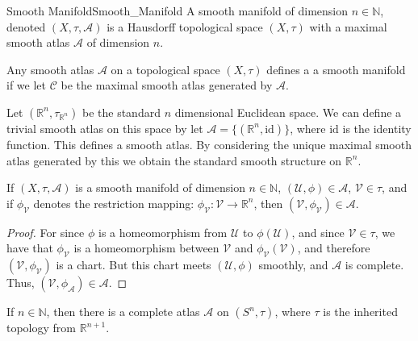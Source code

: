 \documentclass[oneside]{book}                                                  %
\begin{document}
            \begin{fdefinition}{Smooth Manifold}{Smooth_Manifold}
                A smooth manifold of dimension $n\in\mathbb{N}$, denoted
                $(X,\tau,\mathcal{A})$ is a Hausdorff topological space
                $(X,\tau)$ with a maximal smooth atlas $\mathcal{A}$ of
                dimension $n$.
            \end{fdefinition}
            Any smooth atlas $\mathcal{A}$ on a topological space $(X,\tau)$
            defines a a smooth manifold if we let $\mathcal{C}$ be the maximal
            smooth atlas generated by $\mathcal{A}$.
            \begin{example}
                Let $(\mathbb{R}^{n},\tau_{\mathbb{R}^{n}})$ be the standard
                $n$ dimensional Euclidean space. We can define a trivial smooth
                atlas on this space by let
                $\mathcal{A}=\{(\mathbb{R}^{n},\textrm{id})\}$, where $\textrm{id}$
                is the identity function. This defines a smooth atlas. By
                considering the unique maximal smooth atlas generated by this
                we obtain the standard smooth structure on $\mathbb{R}^{n}$.
            \end{example}
            \begin{theorem}
                If $(X,\tau,\mathcal{A})$ is a smooth manifold of dimension
                $n\in\mathbb{N}$, $(\mathcal{U},\phi)\in\mathcal{A}$,
                $\mathcal{V}\in\tau$, and if $\phi_{\mathcal{V}}$ denotes
                the restriction mapping:
                $\phi_{\mathcal{V}}:\mathcal{V}\rightarrow\mathbb{R}^{n}$,
                then $(\mathcal{V},\phi_{\mathcal{V}})\in\mathcal{A}$.
            \end{theorem}
            \begin{proof}
                For since $\phi$ is a homeomorphism from $\mathcal{U}$ to
                $\phi(\mathcal{U})$, and since $\mathcal{V}\in\tau$, we have
                that $\phi_{\mathcal{V}}$ is a homeomorphism between
                $\mathcal{V}$ and $\phi_{\mathcal{V}}(\mathcal{V})$, and
                therefore $(\mathcal{V},\phi_{\mathcal{V}})$ is a chart. But
                this chart meets $(\mathcal{U},\phi)$ smoothly, and $\mathcal{A}$
                is complete. Thus,
                $(\mathcal{V},\phi_{\mathcal{A}})\in\mathcal{A}$.
            \end{proof}
            \begin{theorem}
                If $n\in\mathbb{N}$, then there is a complete atlas
                $\mathcal{A}$ on $(S^{n},\tau)$, where $\tau$ is the inherited
                topology from $\mathbb{R}^{n+1}$.
            \end{theorem}
\end{document}
